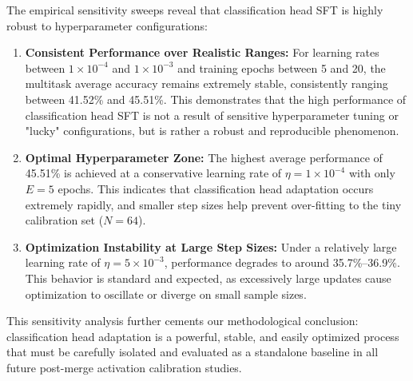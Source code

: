 \documentclass{article}
\theoremstyle{plain}
\theoremstyle{definition}
\theoremstyle{remark}
\begin{document}
The empirical sensitivity sweeps reveal that classification head SFT is highly robust to hyperparameter configurations:
\begin{enumerate}
    \item \textbf{Consistent Performance over Realistic Ranges:} For learning rates between $1 \times 10^{-4}$ and $1 \times 10^{-3}$ and training epochs between 5 and 20, the multitask average accuracy remains extremely stable, consistently ranging between 41.52\% and 45.51\%. This demonstrates that the high performance of classification head SFT is not a result of sensitive hyperparameter tuning or "lucky" configurations, but is rather a robust and reproducible phenomenon.
    \item \textbf{Optimal Hyperparameter Zone:} The highest average performance of 45.51\% is achieved at a conservative learning rate of $\eta = 1 \times 10^{-4}$ with only $E=5$ epochs. This indicates that classification head adaptation occurs extremely rapidly, and smaller step sizes help prevent over-fitting to the tiny calibration set ($N=64$).
    \item \textbf{Optimization Instability at Large Step Sizes:} Under a relatively large learning rate of $\eta = 5 \times 10^{-3}$, performance degrades to around 35.7\%--36.9\%. This behavior is standard and expected, as excessively large updates cause optimization to oscillate or diverge on small sample sizes.
\end{enumerate}
This sensitivity analysis further cements our methodological conclusion: classification head adaptation is a powerful, stable, and easily optimized process that must be carefully isolated and evaluated as a standalone baseline in all future post-merge activation calibration studies.
\end{document}
